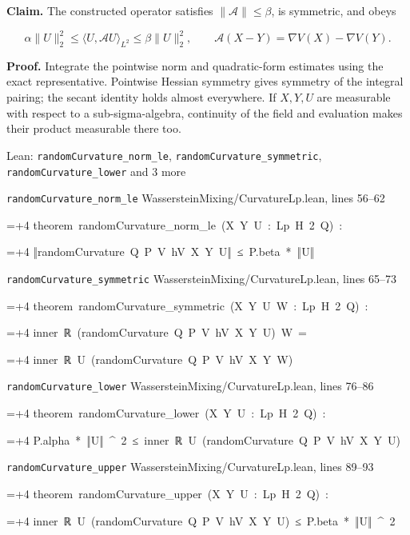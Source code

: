 \documentclass[11pt,a4paper]{report}
\newlength{\leancharwidth}
\newenvironment{leancode}{\par\smallskip\begingroup\ttfamily\footnotesize\raggedright
  \settowidth{\leancharwidth}{M}\setlength{\parskip}{0pt}\setlength{\parindent}{0pt}
  \frenchspacing}{\par\endgroup\smallskip}
\newcommand{\leanline}[2]{\hangindent=\dimexpr#1\leancharwidth+4\leancharwidth\relax
  \hangafter=1\noindent\hspace*{#1\leancharwidth}#2\par}
\newcommand{\leansource}[1]{\par{\footnotesize\color{leanmuted}#1}\par}
\begin{document}
\textbf{Claim.} The constructed operator satisfies \(\|\mathcal A\|\le\beta\), is symmetric, and obeys

\[\alpha\|U\|_2^2\le\langle U,\mathcal A U\rangle_{L^2}\le\beta\|U\|_2^2,\qquad \mathcal A(X-Y)=\nabla V(X)-\nabla V(Y).\]

\textbf{Proof.} Integrate the pointwise norm and quadratic-form estimates using the exact representative. Pointwise Hessian symmetry gives symmetry of the integral pairing; the secant identity holds almost everywhere. If \(X,Y,U\) are measurable with respect to a sub-sigma-algebra, continuity of the field and evaluation makes their product measurable there too.

\begin{leanbox}{Lean: \texttt{randomCurvature\_\allowbreak{}norm\_\allowbreak{}le}, \texttt{randomCurvature\_\allowbreak{}symmetric}, \texttt{randomCurvature\_\allowbreak{}lower} and 3 more}
\leansource{\texttt{randomCurvature\_\allowbreak{}norm\_\allowbreak{}le} \quad WassersteinMixing/\allowbreak{}CurvatureLp.lean, lines 56–62}
\begin{leancode}
\leanline{0}{theorem\ randomCurvature\_norm\_le\ (X\ Y\ U\ :\ Lp\ H\ 2\ Q)\ :}
\leanline{4}{‖randomCurvature\ Q\ P\ V\ hV\ X\ Y\ U‖\ ≤\ P.beta\ *\ ‖U‖}
\end{leancode}
\leansource{\texttt{randomCurvature\_\allowbreak{}symmetric} \quad WassersteinMixing/\allowbreak{}CurvatureLp.lean, lines 65–73}
\begin{leancode}
\leanline{0}{theorem\ randomCurvature\_symmetric\ (X\ Y\ U\ W\ :\ Lp\ H\ 2\ Q)\ :}
\leanline{4}{inner\ ℝ\ (randomCurvature\ Q\ P\ V\ hV\ X\ Y\ U)\ W\ =}
\leanline{6}{inner\ ℝ\ U\ (randomCurvature\ Q\ P\ V\ hV\ X\ Y\ W)}
\end{leancode}
\leansource{\texttt{randomCurvature\_\allowbreak{}lower} \quad WassersteinMixing/\allowbreak{}CurvatureLp.lean, lines 76–86}
\begin{leancode}
\leanline{0}{theorem\ randomCurvature\_lower\ (X\ Y\ U\ :\ Lp\ H\ 2\ Q)\ :}
\leanline{4}{P.alpha\ *\ ‖U‖\ \textasciicircum{}\ 2\ ≤\ inner\ ℝ\ U\ (randomCurvature\ Q\ P\ V\ hV\ X\ Y\ U)}
\end{leancode}
\leansource{\texttt{randomCurvature\_\allowbreak{}upper} \quad WassersteinMixing/\allowbreak{}CurvatureLp.lean, lines 89–93}
\begin{leancode}
\leanline{0}{theorem\ randomCurvature\_upper\ (X\ Y\ U\ :\ Lp\ H\ 2\ Q)\ :}
\leanline{4}{inner\ ℝ\ U\ (randomCurvature\ Q\ P\ V\ hV\ X\ Y\ U)\ ≤\ P.beta\ *\ ‖U‖\ \textasciicircum{}\ 2}

\end{leancode}
\end{leanbox}
\end{document}
